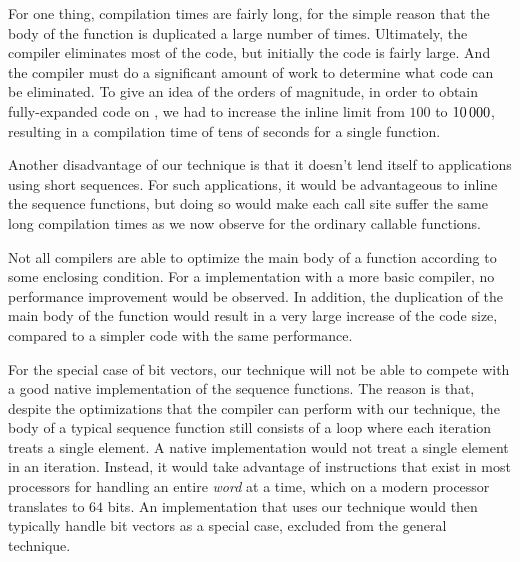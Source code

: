 For one thing, compilation times are fairly long, for the simple
reason that the body of the function is duplicated a large number of
times.  Ultimately, the compiler eliminates most of the code, but
initially the code is fairly large.  And the compiler must do a
significant amount of work to determine what code can be eliminated.
To give an idea of the orders of magnitude, in order to obtain
fully-expanded code on \sbcl{}, we had to increase the inline limit from
$100$ to $10\thinspace000$, resulting in a compilation time of tens of
seconds for a single function.

Another disadvantage of our technique is that it doesn't lend itself
to applications using short sequences.  For such applications, it
would be advantageous to inline the sequence functions, but doing so
would make each call site suffer the same long compilation times as we
now observe for the ordinary callable functions.

Not all compilers are able to optimize the main body of a function
according to some enclosing condition.  For a \commonlisp{}
implementation with a more basic compiler, no performance improvement
would be observed.  In addition, the duplication of the main body of
the function would result in a very large increase of the code size,
compared to a simpler code with the same performance.

For the special case of bit vectors, our technique will not be able to
compete with a good native implementation of the sequence functions.
The reason is that, despite the optimizations that the compiler can
perform with our technique, the body of a typical sequence function
still consists of a loop where each iteration treats a single element.
A native implementation would not treat a single element in an
iteration.  Instead, it would take advantage of instructions that
exist in most processors for handling an entire \emph{word} at a time,
which on a modern processor translates to $64$ bits.  An
implementation that uses our technique would then typically handle bit
vectors as a special case, excluded from the general technique.

